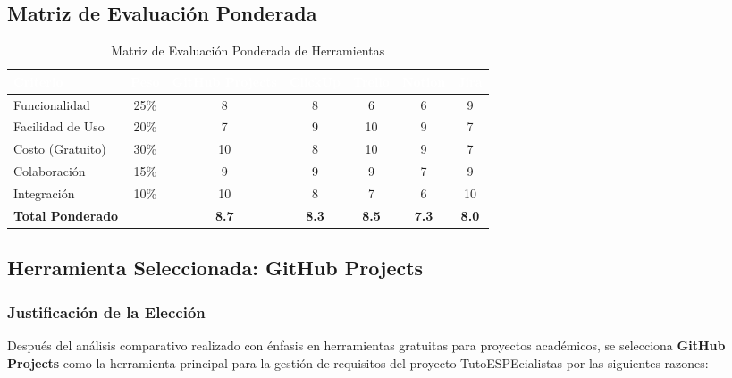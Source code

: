 \documentclass[12pt,a4paper]{article}
\begin{document}
\subsection{Matriz de Evaluación Ponderada}

\begin{table}[H]
\centering
\begin{tabular}{|p{2.5cm}|c|c|c|c|c|c|}
\hline
\rowcolor{headercolor}
\textcolor{white}{\textbf{Criterio}} & 
\textcolor{white}{\textbf{Peso}} & 
\textcolor{white}{\textbf{GitHub Projects}} & 
\textcolor{white}{\textbf{ClickUp}} & 
\textcolor{white}{\textbf{Trello}} & 
\textcolor{white}{\textbf{Notion}} & 
\textcolor{white}{\textbf{Jira}} \\
\hline

Funcionalidad & 25\% & 8 & 8 & 6 & 6 & 9 \\
\hline
\rowcolor{lightgray}

Facilidad de Uso & 20\% & 7 & 9 & 10 & 9 & 7 \\
\hline

Costo (Gratuito) & 30\% & 10 & 8 & 10 & 9 & 7 \\
\hline
\rowcolor{lightgray}

Colaboración & 15\% & 9 & 9 & 9 & 7 & 9 \\
\hline

Integración & 10\% & 10 & 8 & 7 & 6 & 10 \\
\hline

\textbf{Total Ponderado} & & \textbf{8.7} & \textbf{8.3} & \textbf{8.5} & \textbf{7.3} & \textbf{8.0} \\
\hline

\end{tabular}
\caption{Matriz de Evaluación Ponderada de Herramientas}
\end{table}

\subsection{Herramienta Seleccionada: GitHub Projects}

\subsubsection{Justificación de la Elección}

Después del análisis comparativo realizado con énfasis en herramientas gratuitas para proyectos académicos, se selecciona \textbf{GitHub Projects} como la herramienta principal para la gestión de requisitos del proyecto TutoESPEcialistas por las siguientes razones:
\end{document}
